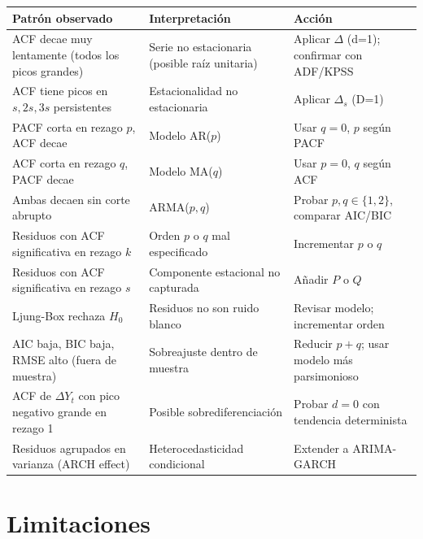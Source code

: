 \documentclass[12pt,a4paper]{article}
\theoremstyle{definition}
\begin{document}
\begin{center}
\renewcommand{\arraystretch}{1.4}
\begin{longtable}{p{4.5cm}p{5cm}p{3.5cm}}
\toprule
\textbf{Patrón observado} & \textbf{Interpretación} & \textbf{Acción} \\
\midrule
ACF decae muy lentamente (todos los picos grandes) & Serie no estacionaria (posible raíz unitaria) & Aplicar $\Delta$ (d=1); confirmar con ADF/KPSS \\
\midrule
ACF tiene picos en $s,2s,3s$ persistentes & Estacionalidad no estacionaria & Aplicar $\Delta_s$ (D=1) \\
\midrule
PACF corta en rezago $p$, ACF decae & Modelo AR($p$) & Usar $q=0$, $p$ según PACF \\
\midrule
ACF corta en rezago $q$, PACF decae & Modelo MA($q$) & Usar $p=0$, $q$ según ACF \\
\midrule
Ambas decaen sin corte abrupto & ARMA($p,q$) & Probar $p,q \in \{1,2\}$, comparar AIC/BIC \\
\midrule
Residuos con ACF significativa en rezago $k$ & Orden $p$ o $q$ mal especificado & Incrementar $p$ o $q$ \\
\midrule
Residuos con ACF significativa en rezago $s$ & Componente estacional no capturada & Añadir $P$ o $Q$ \\
\midrule
Ljung-Box rechaza $H_0$ & Residuos no son ruido blanco & Revisar modelo; incrementar orden \\
\midrule
AIC baja, BIC baja, RMSE alto (fuera de muestra) & Sobreajuste dentro de muestra & Reducir $p+q$; usar modelo más parsimonioso \\
\midrule
ACF de $\Delta Y_t$ con pico negativo grande en rezago 1 & Posible sobrediferenciación & Probar $d=0$ con tendencia determinista \\
\midrule
Residuos agrupados en varianza (ARCH effect) & Heterocedasticidad condicional & Extender a ARIMA-GARCH \\
\bottomrule
\end{longtable}
\end{center}

\section{Limitaciones}
\end{document}
